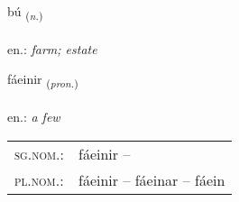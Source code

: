 \documentclass[frontgrid, backgrid]{flacards}\usepackage[]{graphicx}\usepackage[]{xcolor}
\begin{document}
\renewcommand{\flhead}{\vskip5pt \fboxsep=0pt {\small\bfseries\footnotesize Nafnorð | Noun}}
\renewcommand{\fcfoot}{\vskip5pt \fboxsep=0pt \hspace{2pt}{\small\bfseries\footnotesize 2K}}

\renewcommand{\blhead}{\vskip5pt {\small\bfseries\footnotesize Nafnorð | Noun }}
\renewcommand{\bcfoot}{\vskip5pt \hspace{2pt}{\small\bfseries\footnotesize 2K}}


{bú \small{\textsubscript{(\textit{n.})}} \\[1ex] %
\textphonetic{[puː]} \\
en.: \emph{farm; estate} \\  [2ex]
\renewcommand*{\arraystretch}{0.8}
}

\renewcommand{\flhead}{\vskip5pt \fboxsep=0pt {\small\bfseries\footnotesize Fornafn | Pronoun}}
\renewcommand{\fcfoot}{\vskip5pt \fboxsep=0pt \hspace{2pt}{\small\bfseries\footnotesize 2K}}

\renewcommand{\blhead}{\vskip5pt {\small\bfseries\footnotesize Fornafn | Pronoun }}
\renewcommand{\bcfoot}{\vskip5pt \hspace{2pt}{\small\bfseries\footnotesize 2K}}


{fáeinir \small{\textsubscript{(\textit{pron.})}} \\[1ex] %
\textphonetic{[fauːeinɪr]} \\
en.: \emph{a few} \\  [2ex]
\renewcommand*{\arraystretch}{0.8}
\begin{tabular}{ll}
\textsc{sg.nom.}: & fáeinir  -- \\ 
\textsc{pl.nom.}: & fáeinir -- fáeinar -- fáein
\end{tabular}
}
\end{document}
